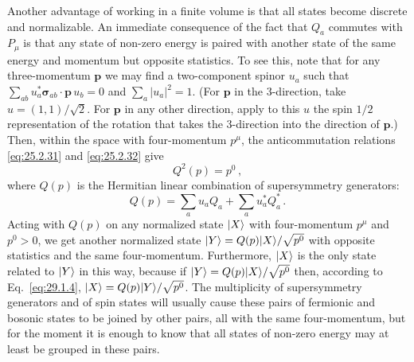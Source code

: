 Another advantage of working in a finite volume is that all states become
discrete and normalizable. An immediate consequence of the fact that
\(Q_a\) commutes with \(P_\mu\) is that any state of non-zero energy is
paired with another state of the same energy and momentum but opposite
statistics. To see this, note that for any three-momentum \(\mathbf p\) we
may find a two-component spinor \(u_a\) such that
\(\sum_{ab}u_a^*\boldsymbol{\sigma}_{ab}\mathbin{\cdot}\mathbf p\,u_b=0\)
and \(\sum_a\lvert u_a\rvert^2=1\). (For \(\mathbf p\) in the
3-direction, take \(u=(1,1)/\sqrt{2}\). For \(\mathbf p\) in any other
direction, apply to this \(u\) the spin \(1/2\) representation of the
rotation that takes the 3-direction into the direction of \(\mathbf p\).)
Then, within the space with four-momentum \(p^\mu\), the anticommutation
relations \eqref{eq:25.2.31} and \eqref{eq:25.2.32} give
\begin{equation}
  Q^2(p)=p^0\,,
  \tag{29.1.4}\label{eq:29.1.4}
\end{equation}
where \(Q(p)\) is the Hermitian linear combination of supersymmetry
generators:
\begin{equation}
  Q(p)=\sum_a u_aQ_a+\sum_a u_a^*Q_a^*\,.
  \tag{29.1.5}\label{eq:29.1.5}
\end{equation}
Acting with \(Q(p)\) on any normalized state \(\lvert X\rangle\) with
four-momentum \(p^\mu\) and \(p^0>0\), we get another normalized state
\(\lvert Y\rangle=Q(p)\lvert X\rangle/\sqrt{p^0}\) with opposite statistics and the same
four-momentum. Furthermore, \(\lvert X\rangle\) is the only state related to
\(\lvert Y\rangle\) in this way, because if
\(\lvert Y\rangle=Q(p)\lvert X\rangle/\sqrt{p^0}\) then, according to
Eq.~\eqref{eq:29.1.4}, \(\lvert X\rangle=Q(p)\lvert Y\rangle/\sqrt{p^0}\). The
multiplicity of supersymmetry generators and of spin states will usually
cause these pairs of fermionic and bosonic states to be joined by other
pairs, all with the same four-momentum, but for the moment it is enough to
know that all states of non-zero energy may at least be grouped in these
pairs.

